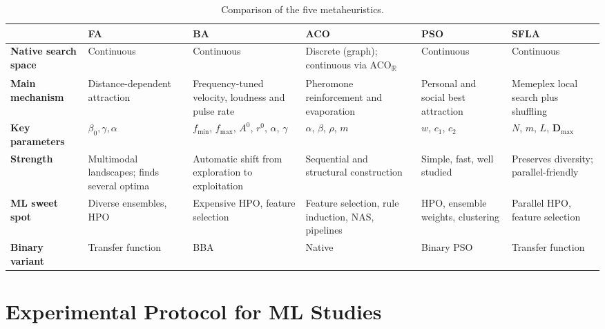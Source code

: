 \documentclass[11pt,a4paper]{article}
\newcommand{\ACOR}{ACO\textsubscript{$\mathbb{R}$}}
\newcommand{\vect}[1]{\mathbf{#1}}
\begin{document}
\begin{table}[htbp]
\centering
\footnotesize
\caption{Comparison of the five metaheuristics.}
\label{tab:summary}
\begin{tabularx}{\linewidth}{@{}>{\raggedright\arraybackslash}p{2.1cm}YYYYY@{}}
\toprule
 & \textbf{FA} & \textbf{BA} & \textbf{ACO} & \textbf{PSO} & \textbf{SFLA} \\
\midrule
\textbf{Native search space} & Continuous & Continuous & Discrete (graph); continuous via \ACOR & Continuous & Continuous \\
\addlinespace
\textbf{Main mechanism} & Distance-dependent attraction & Frequency-tuned velocity, loudness and pulse rate & Pheromone reinforcement and evaporation & Personal and social best attraction & Memeplex local search plus shuffling \\
\addlinespace
\textbf{Key parameters} & $\beta_0, \gamma, \alpha$ & $f_{\min}$, $f_{\max}$, $A^0$, $r^0$, $\alpha$, $\gamma$ & $\alpha$, $\beta$, $\rho$, $m$ & $w$, $c_1$, $c_2$ & $N$, $m$, $L$, $\vect{D}_{\max}$ \\
\addlinespace
\textbf{Strength} & Multimodal landscapes; finds several optima & Automatic shift from exploration to exploitation & Sequential and structural construction & Simple, fast, well studied & Preserves diversity; parallel-friendly \\
\addlinespace
\textbf{ML sweet spot} & Diverse ensembles, HPO & Expensive HPO, feature selection & Feature selection, rule induction, NAS, pipelines & HPO, ensemble weights, clustering & Parallel HPO, feature selection \\
\addlinespace
\textbf{Binary variant} & Transfer function & BBA \citep{nakamura2012} & Native & Binary PSO \citep{kennedy1997} & Transfer function \\
\bottomrule
\end{tabularx}
\end{table}

\section{Experimental Protocol for ML Studies}
\label{sec:protocol}
\end{document}
